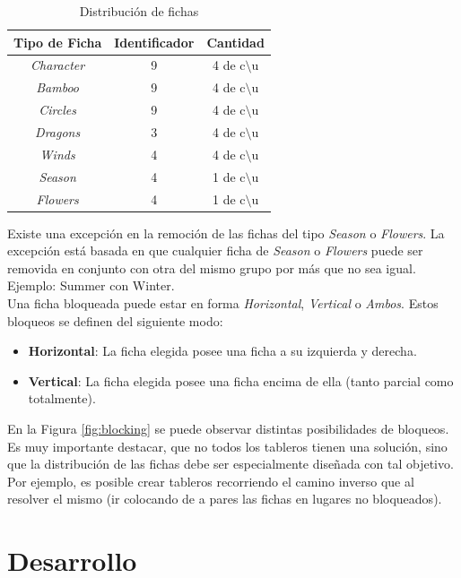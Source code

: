 \documentclass{sig-alternate}
\begin{document}
\begin{table}[h]
\begin{center}
	\begin{tabular}{|c|c|c|}
	\hline
	 Tipo de Ficha & Identificador & Cantidad\\
	\hline \hline
	\textit{Character} & 9 & 4 de c$\setminus$u \\
	\textit{Bamboo} & 9 & 4 de  c$\setminus$u  \\
	\textit{Circles} & 9 & 4 de  c$\setminus$u  \\
	\textit{Dragons} & 3 & 4 de  c$\setminus$u  \\	
	\textit{Winds} & 4 & 4 de  c$\setminus$u  \\
	\textit{Season} & 4 & 1 de c$\setminus$u \\
	\textit{Flowers} & 4 & 1 de  c$\setminus$u  \\
	\hline
	\end{tabular}
\end{center}
\caption{Distribuci\'on de fichas}
\label{tab:tiles}
\end{table}

	Existe una excepci\'on en la remoci\'on de las fichas del tipo \textit{Season} o \textit{Flowers}. La excepci\'on est\'a basada en que cualquier ficha de \textit{Season} o \textit{Flowers} puede ser removida en conjunto con otra del mismo grupo por más que no sea igual. Ejemplo: Summer con Winter. \\
	Una ficha bloqueada puede estar en forma \textit{Horizontal}, \textit{Vertical} o \textit{Ambos}. Estos bloqueos se definen del siguiente modo:
	\begin{itemize}
		\item \textbf{Horizontal}: La ficha elegida posee una ficha a su izquierda y derecha.
		\item \textbf{Vertical}: La ficha elegida posee una ficha encima de ella (tanto parcial como totalmente).		
	\end{itemize}
	En la Figura \ref{fig:blocking} se puede observar distintas posibilidades de bloqueos.\\
	Es muy importante destacar, que no todos los tableros tienen una soluci\'on, sino que la distribuci\'on de las fichas debe ser especialmente dise\~nada con tal objetivo. Por ejemplo, es posible crear tableros recorriendo el camino inverso que al resolver el mismo (ir colocando de a pares las fichas en lugares no bloqueados).
\section*{Desarrollo}
\end{document}
